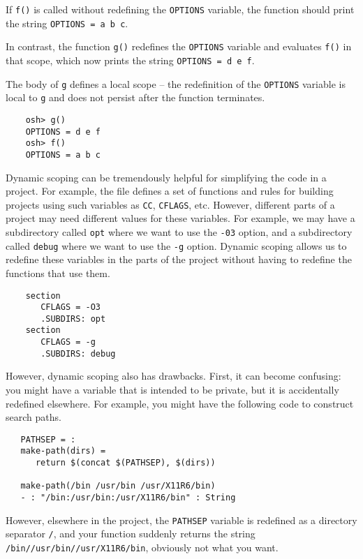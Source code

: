 If \verb+f()+ is called without redefining the \verb+OPTIONS+ variable,
the function should print the string \verb+OPTIONS = a b c+.

In contrast, the function \verb+g()+ redefines the \verb+OPTIONS+
variable and evaluates \verb+f()+ in that scope, which now prints the
string \verb+OPTIONS = d e f+.

The body of \verb+g+ defines a local scope -- the redefinition of the
\verb+OPTIONS+ variable is local to \verb+g+ and does not persist
after the function terminates.

\begin{verbatim}
    osh> g()
    OPTIONS = d e f
    osh> f()
    OPTIONS = a b c
\end{verbatim}

Dynamic scoping can be tremendously helpful for simplifying the code
in a project.  For example, the  file defines a set of
functions and rules for building projects using such variables as
\verb+CC+, \verb+CFLAGS+, etc.  However, different parts of a project
may need different values for these variables.  For example, we may
have a subdirectory called \verb+opt+ where we want to use the
\verb+-03+ option, and a subdirectory called \verb+debug+ where we
want to use the \verb+-g+ option.  Dynamic scoping allows us to redefine
these variables in the parts of the project without having to
redefine the functions that use them.

\begin{verbatim}
    section
       CFLAGS = -O3
       .SUBDIRS: opt
    section
       CFLAGS = -g
       .SUBDIRS: debug
\end{verbatim}

However, dynamic scoping also has drawbacks.  First, it can become
confusing: you might have a variable that is intended to be private,
but it is accidentally redefined elsewhere.  For example, you might
have the following code to construct search paths.

\begin{verbatim}
   PATHSEP = :
   make-path(dirs) =
      return $(concat $(PATHSEP), $(dirs))

   make-path(/bin /usr/bin /usr/X11R6/bin)
   - : "/bin:/usr/bin:/usr/X11R6/bin" : String
\end{verbatim}

However, elsewhere in the project, the \verb+PATHSEP+ variable is
redefined as a directory separator \verb+/+, and your function
suddenly returns the string \verb+/bin//usr/bin//usr/X11R6/bin+,
obviously not what you want.

